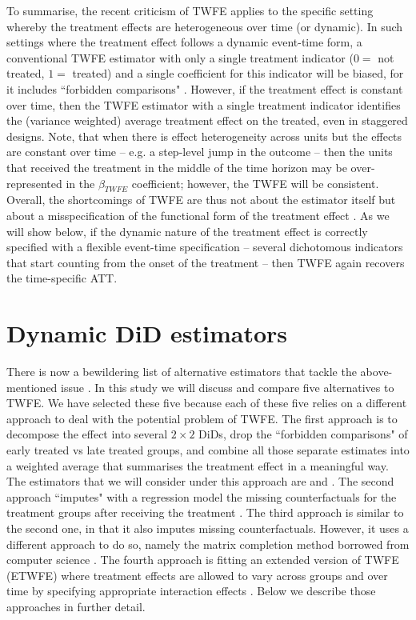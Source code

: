 To summarise, the recent criticism of TWFE applies to the specific setting whereby the treatment effects are heterogeneous over time (or dynamic). In such settings where the treatment effect follows a dynamic event-time form, a conventional TWFE estimator with only a single treatment indicator ($0 =$ not treated, $1 =$ treated) and a single coefficient for this indicator will be biased, for it includes ``forbidden comparisons" . However, if the treatment effect is constant over time, then the TWFE estimator with a single treatment indicator identifies the (variance weighted) average treatment effect on the treated, even in staggered designs. Note, that when there is effect heterogeneity across units but the effects are constant over time -- e.g. a step-level jump in the outcome -- then the units that received the treatment in the middle of the time horizon may be over-represented in the $\beta_{TWFE}$ coefficient; however, the TWFE will be consistent. Overall, the shortcomings of TWFE are thus not about the estimator itself but about a misspecification of the functional form of the treatment effect \cite{Goodman-Bacon.2021, Wooldridge.2021}. As we will show below, if the dynamic nature of the treatment effect is correctly specified with a flexible event-time specification -- several dichotomous indicators that start counting from the onset of the treatment \cite{Ludwig.2021} -- then TWFE again recovers the time-specific ATT. 
  

\section{Dynamic DiD estimators}

There is now a bewildering list of alternative estimators that tackle the above-mentioned issue \cite[for formal reviews see][]{Chiu.2023, Roth.2023}. In this study we will discuss and compare five alternatives to TWFE. We have selected these five because each of these five relies on a different approach to deal with the potential problem of TWFE. The first approach is to decompose the effect into several $2 \times 2$ DiDs, drop the ``forbidden comparisons" of early treated vs late treated groups, and combine all those separate estimates into a weighted average that summarises the treatment effect in a meaningful way. The estimators that we will consider under this approach are \textcite{Sun.2021} and \textcite{Callaway.2020}. The second approach ``imputes" with a regression model the missing counterfactuals for the treatment groups after receiving the treatment \cite{Borusyak.2023}. The third approach is similar to the second one, in that it also imputes missing counterfactuals. However, it uses a different approach to do so, namely the matrix completion method borrowed from computer science \cite{Athey.2021}. The fourth approach is fitting an extended version of TWFE (ETWFE) where treatment effects are allowed to vary across groups and over time by specifying appropriate interaction effects \cite{Wooldridge.2021}. Below we describe those approaches in further detail.



